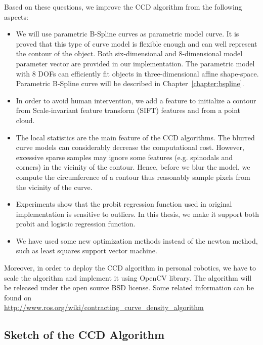 Based on these questions, we improve the CCD algorithm from the
following aspects:
\begin{itemize}
\item We will use parametric B-Spline curves as
parametric model curve. It is proved that this type of curve model is
flexible enough and can well represent the contour of the
object. Both six-dimensional and 8-dimensional model parameter vector
are provided in our implementation. The parametric model with 8 DOFs
can efficiently fit objects in three-dimensional affine
shape-space. Parametric B-Spline curve will be described in Chapter~\ref{chapter:bspline}.
\item In order to avoid human intervention, we add a feature to 
  initialize a contour from Scale-invariant feature transform (SIFT)
  features and from a point cloud.
\item The local statistics are the main feature of the CCD
  algorithms. The blurred curve models can considerably decrease the
  computational cost. However, excessive sparse samples may ignore some
  features (e.g. spinodals and corners) in the vicinity of the contour. Hence, before we blur the
  model, we compute the circumference of a contour thus reasonably
  sample pixels from the vicinity of the curve.
\item Experiments show that the probit regression function used
  in original implementation is sensitive to outliers. In this
  thesis, we make it support both probit and logistic regression
  function.
\item We have used some new optimization methods instead of the
  newton method, such as least squares support vector machine.
\end{itemize}


Moreover, in order to deploy the CCD algorithm in personal robotics,
we have to scale the algorithm and implement it using OpenCV library.
The algorithm will be released under the open source BSD license. Some
related information can be found on\\
\url{http://www.ros.org/wiki/contracting\_curve\_density\_algorithm}

\subsection{Sketch of the CCD Algorithm}
\label{sec:sccd}

